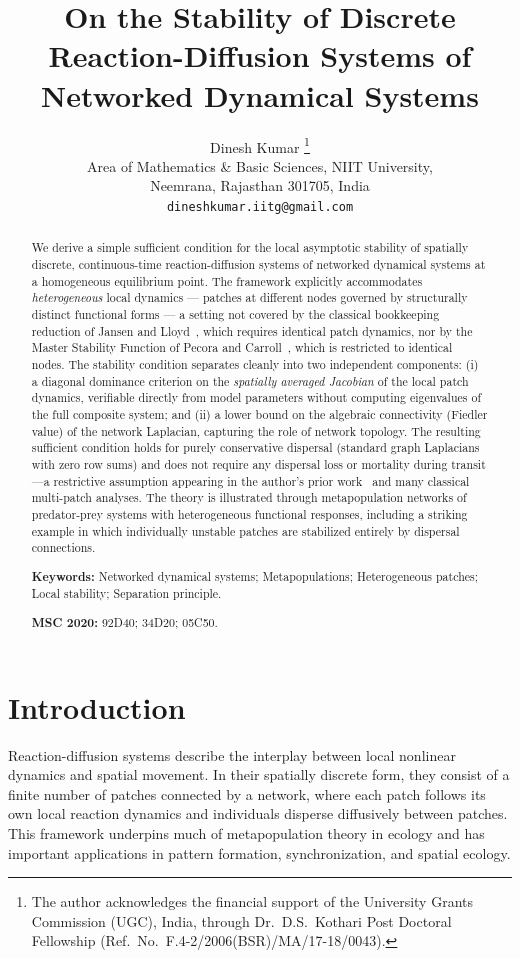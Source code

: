 \documentclass[12pt,a4paper]{article}
\title{On the Stability of Discrete Reaction-Diffusion Systems of Networked Dynamical Systems}
\author{Dinesh Kumar
\thanks{The author acknowledges the financial support of the University
    Grants Commission (UGC), India, through Dr.\ D.S.\ Kothari Post Doctoral
    Fellowship (Ref.\ No.\ F.4-2/2006(BSR)/MA/17-18/0043).}\\
  \small Area of Mathematics \& Basic Sciences, NIIT University,\\
  \small Neemrana, Rajasthan 301705, India\\[2pt]
  \small \texttt{dineshkumar.iitg@gmail.com}
}
\date{}
\theoremstyle{definition}
\begin{document}
\maketitle

\begin{abstract}
We derive a simple sufficient condition for the local asymptotic stability of spatially discrete, continuous-time reaction-diffusion systems of networked dynamical systems at a homogeneous equilibrium point. The framework explicitly accommodates \emph{heterogeneous} local dynamics --- patches at different nodes governed by structurally distinct functional forms --- a setting not covered by the classical bookkeeping reduction of Jansen and Lloyd~\cite{jansen2000}, which requires identical patch dynamics, nor by the Master Stability Function of Pecora and Carroll~\cite{pecora1998}, which is restricted to identical nodes. The stability condition separates cleanly into two independent components: (i) a diagonal dominance criterion on the \emph{spatially averaged Jacobian} of the local patch dynamics, verifiable directly from model parameters without computing eigenvalues of the full composite system; and (ii) a lower bound on the algebraic connectivity (Fiedler value) of the network Laplacian, capturing the role of network topology. The resulting sufficient condition holds for purely conservative dispersal (standard graph Laplacians with zero row sums) and does not require any dispersal loss or mortality during transit---a restrictive assumption appearing in the author's prior work~\cite{kumar2021} and many classical multi-patch analyses. The theory is illustrated through metapopulation networks of predator-prey systems with heterogeneous functional responses, including a striking example in which individually unstable patches are stabilized entirely by dispersal connections.

\medskip\noindent
\textbf{Keywords:} Networked dynamical systems; Metapopulations;  Heterogeneous patches;  Local stability; Separation principle.

\medskip\noindent
\textbf{MSC 2020:} 92D40; 34D20; 05C50.
\end{abstract}


\section{Introduction}
\label{sec:intro}

Reaction-diffusion systems describe the interplay between local nonlinear dynamics and spatial movement. In their spatially discrete form, they consist of a finite number of patches connected by a network, where each patch follows its own local reaction dynamics and individuals disperse diffusively between patches. This framework underpins much of metapopulation theory in ecology and has important applications in pattern formation, synchronization, and spatial ecology.
\end{document}
